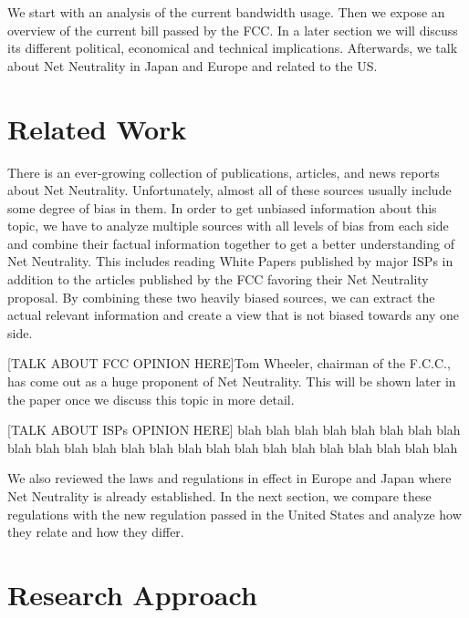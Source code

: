 \documentclass{sigcomm-alternate}
\begin{document}
We start with an analysis of the current bandwidth usage. Then we expose an overview of the current bill passed by the FCC. In a later section we will discuss its different political, economical and technical implications. Afterwards, we talk about Net Neutrality in Japan and Europe and related to the US.


\section{Related Work}
There is an ever-growing collection of publications, articles, and news reports about Net Neutrality. Unfortunately, almost all of these sources usually include some degree of bias in them. In order to get unbiased information about this topic, we have to analyze multiple sources with all levels of bias from each side and combine their factual information together to get a better understanding of Net Neutrality. This includes reading White Papers published by major ISPs in addition to the articles published by the FCC favoring their Net Neutrality proposal. By combining these two heavily biased sources, we can extract the actual relevant information and create a view that is not biased towards any one side. 

[TALK ABOUT FCC OPINION HERE]Tom Wheeler, chairman of the F.C.C., has come out as a huge proponent of Net Neutrality. This will be shown later in the paper once we discuss this topic in more detail.


[TALK ABOUT ISPs OPINION HERE]
blah blah blah blah blah blah blah blah blah blah blah blah blah blah blah blah blah blah blah blah blah blah blah blah

We also reviewed the laws and regulations in effect in Europe and Japan where Net Neutrality is already established. In the next section, we compare these regulations with the new regulation passed in the United States and analyze how they relate and how they differ.

\section{Research Approach}
\end{document}
